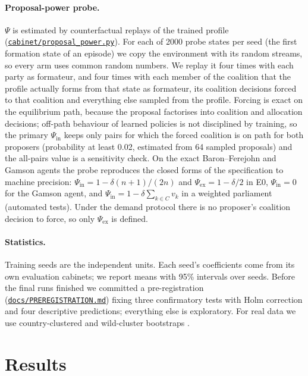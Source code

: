 \documentclass[11pt,a4paper]{article}
\newcommand{\repo}{https://github.com/bot2048/cabinet-bargaining-marl}
\newcommand{\code}[1]{\href{\repo/blob/main/#1}{\texttt{\small #1}}}
\begin{document}
\paragraph{Proposal-power probe.} $\Psi$ is estimated by counterfactual replays of the trained profile
(\code{cabinet/proposal\_power.py}). For each of 2000 probe states per seed (the first formation state of
an episode) we copy the environment with its random streams, so every arm uses common random numbers. We
replay it four times with each party as formateur, and four times with each member of the coalition that
the profile actually forms from that state as formateur, its coalition decisions forced to that coalition
and everything else sampled from the profile. Forcing is exact on the equilibrium path, because the
proposal factorises into coalition and allocation decisions; off-path behaviour of learned policies is not
disciplined by training, so the primary $\Psi_{\mathrm{in}}$ keeps only pairs for which the forced
coalition is on path for both proposers (probability at least 0.02, estimated from 64 sampled proposals)
and the all-pairs value is a sensitivity check. On the exact Baron--Ferejohn and Gamson agents the probe
reproduces the closed forms of the specification to machine precision: $\Psi_{\mathrm{in}}=1-\delta(n+1)/(2n)$
and $\Psi_{\mathrm{ex}}=1-\delta/2$ in E0, $\Psi_{\mathrm{in}}=0$ for the Gamson agent, and
$\Psi_{\mathrm{in}}=1-\delta\sum_{k\in C}v_k$ in a weighted parliament (automated tests). Under the demand
protocol there is no proposer's coalition decision to force, so only $\Psi_{\mathrm{ex}}$ is defined.

\paragraph{Statistics.} Training seeds are the independent units. Each seed's coefficients come from its
own evaluation cabinets; we report means with 95\% intervals over seeds. Before the final runs finished
we committed a pre-registration (\code{docs/PREREGISTRATION.md}) fixing three confirmatory tests with
Holm correction and four descriptive predictions; everything else is exploratory. For real data we use
country-clustered and wild-cluster bootstraps \citep{cameron2008}.

\section{Results}\label{sec:results}
\end{document}
